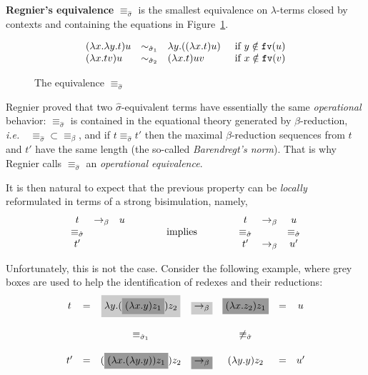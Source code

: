 \documentclass{LMCS}
\newcommand{\ie}{{\it  i.e.}~}
\renewcommand{\>}{\rightarrow}
\def\lam{\lambda}
\newcommand{\Rew}[1]{\rightarrow_{#1}}
\newcommand{\fv}[1]{{\tt fv}(#1)}
\newcommand{\Beta}{{\tt \beta}}
\newcommand{\deft}[1]{{\bf #1}}
\newcommand{\eqw}[1]{\equiv_{#1}}
\newcommand{\preeqw}[1]{\sim_{#1}}
\def\rsig{\hat{\sigma}}
\newcommand{\grisar}[1]{\colorbox{LightGray}{\ensuremath{#1}}}
\newcommand{\grisarOscuro}[1]{\colorbox{DarkGray}{\ensuremath{#1}}}
\begin{document}
\deft{Regnier's equivalence} $\equiv_{\rsig}$ is the smallest
equivalence on $\lam$-terms closed by contexts and containing the 
equations in Figure~\ref{f:regnier}. 
\begin{figure}[ht]
\[ \begin{array}{lll@{\hspace{.5cm}}l}
(\lam x. \lam y.t) u & \preeqw{\rsig_1} & \lam y. ((\lam x.t) u) & \mbox{if } y\notin\fv{u}\\
(\lam x.t v) u     & \preeqw{\rsig_2} & (\lam x. t) u v    & \mbox{if } x\notin \fv{v}\\
\end{array}\]
\caption{The  equivalence $\equiv_{\rsig}$ }
\label{f:regnier}
\end{figure}

\noindent Regnier proved that two $\rsig$-equivalent terms have
essentially the same {\it operational} behavior: $\eqw{\rsig}$ is contained
in the equational theory generated by $\beta$-reduction, \ie\ 
$\eqw{\rsig}\subset\eqw{\beta}$, and if $t\eqw{\rsig} t'$ then 
the maximal $\beta$-reduction
sequences from $t$ and $t'$ have the same length (the
so-called \textit{Barendregt's norm}). That is why Regnier calls $\eqw{\rsig}$ an \textit{operational
  equivalence}. \medskip

It is then natural to expect that 
the previous property can be \textit{locally} reformulated in terms of a
strong
bisimulation, namely, 
 \[ \begin{array}{cccc@{\hspace{1cm}}c@{\hspace{1cm}}ccccc}
  t				& \Rew{\beta}	& u	&&				&&  t			& \Rew{\beta}	& u	\\
  \eqw{\rsig}	&		&	&& \mbox{ implies }	&&\eqw{\rsig}	&		&\eqw{\rsig}	\\
  t'				&		&	&&				&&t'				&\Rew{\beta}	& u' \\
 \end{array}
\]

Unfortunately, this is not
the case. Consider the following example, where 
grey boxes are used to help the identification of redexes and their reductions: 
\[ \begin{array}{cccccccccc}
t&=& \grisar{\lam y. (\grisarOscuro{(\lam x.y) z_1}) z_2} & \grisar{\Rew{\Beta}} &
     \grisarOscuro{(\lam x.z_2) z_1} & =  & u \\
\\
&&\eqw{\rsig_1}&&\not \eqw{\rsig}
\\\\
t'&=&(\grisarOscuro{(\lam x. (\lam y. y)) z_1}) z_2 & \grisarOscuro{\Rew{\Beta}} & (\lam y. y) z_2 & = & u'
\end{array}\]
\end{document}
